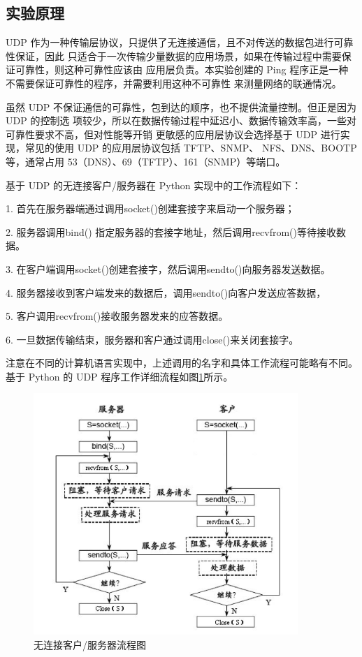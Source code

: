 \documentclass[a4paper,12pt]{report}
\begin{document}
\begin{spacing}{1.5}
\subsection{实验原理}
UDP 作为一种传输层协议，只提供了无连接通信，且不对传送的数据包进行可靠性保证，因此 只适合于一次传输少量数据的应用场景，如果在传输过程中需要保证可靠性，则这种可靠性应该由 应用层负责。本实验创建的 Ping 程序正是一种不需要保证可靠性的程序，并需要利用这种不可靠性 来测量网络的联通情况。

虽然 UDP 不保证通信的可靠性，包到达的顺序，也不提供流量控制。但正是因为 UDP 的控制选 项较少，所以在数据传输过程中延迟小、数据传输效率高，一些对可靠性要求不高，但对性能等开销 更敏感的应用层协议会选择基于 UDP 进行实现，常见的使用 UDP 的应用层协议包括 TFTP、SNMP、 NFS、DNS、BOOTP 等，通常占用 53（DNS）、69（TFTP）、161（SNMP）等端口。

基于 UDP 的无连接客户/服务器在 Python 实现中的工作流程如下：

1. 首先在服务器端通过调用socket()创建套接字来启动一个服务器；

2. 服务器调用bind() 指定服务器的套接字地址，然后调用recvfrom()等待接收数据。

3. 在客户端调用socket()创建套接字，然后调用sendto()向服务器发送数据。

4. 服务器接收到客户端发来的数据后，调用sendto()向客户发送应答数据，

5. 客户调用recvfrom()接收服务器发来的应答数据。

6. 一旦数据传输结束，服务器和客户通过调用close()来关闭套接字。

注意在不同的计算机语言实现中，上述调用的名字和具体工作流程可能略有不同。基于 Python 的 UDP 程序工作详细流程如图\ref{1}所示。

\begin{figure}[H]
  \centering
\includegraphics[width=10cm]{figure/1.png}
\caption{无连接客户/服务器流程图}
\label{1}
\end{figure}


\end{spacing}
\end{document}

